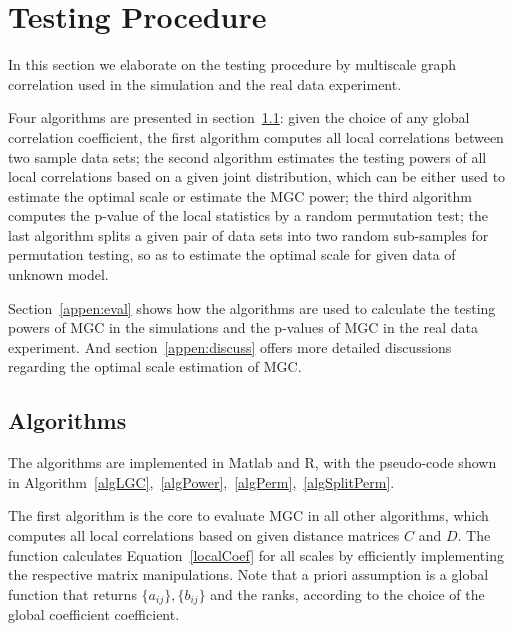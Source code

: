 \documentclass[11pt]{article}
\begin{document}

\section{Testing Procedure}
\label{appen:tests}

In this section we elaborate on the testing procedure by multiscale graph correlation used in the simulation and the real data experiment. 

Four algorithms are presented in section~\ref{appen:algorithms}: given the choice of any global correlation coefficient, the first algorithm computes all local correlations between two sample data sets; the second algorithm estimates the testing powers of all local correlations based on a given joint distribution, which can be either used to estimate the optimal scale or estimate the MGC power; the third algorithm computes the p-value of the local statistics by a random permutation test; the last algorithm splits a given pair of data sets into two random sub-samples for permutation testing, so as to estimate the optimal scale for given data of unknown model. 

Section~\ref{appen:eval} shows how the algorithms are used to calculate the testing powers of MGC in the simulations and the p-values of MGC in the real data experiment. And section~\ref{appen:discuss} offers more detailed discussions regarding the optimal scale estimation of MGC.

\subsection{Algorithms}
\label{appen:algorithms}
The algorithms are implemented in Matlab and R, with the pseudo-code shown in Algorithm~\ref{algLGC},~\ref{algPower},~\ref{algPerm},~\ref{algSplitPerm}.

The first algorithm is the core to evaluate MGC in all other algorithms, which computes all local correlations based on given distance matrices $C$ and $D$. The function calculates Equation~\ref{localCoef} for all scales by efficiently implementing the respective matrix manipulations. Note that a priori assumption is a global function that returns $\{a_{ij}\},\{b_{ij}\}$ and the ranks, according to the choice of the global coefficient coefficient.
\end{document}
